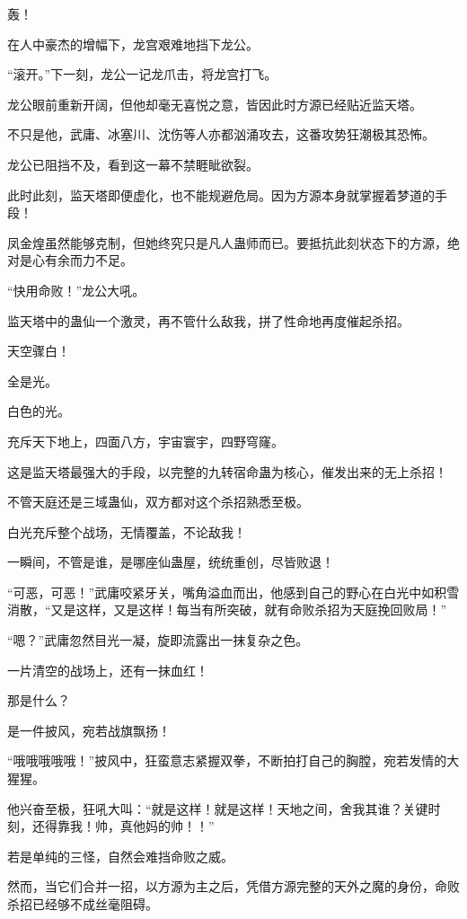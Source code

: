 
\begin{this_body}

轰！

在人中豪杰的增幅下，龙宫艰难地挡下龙公。

“滚开。”下一刻，龙公一记龙爪击，将龙宫打飞。

龙公眼前重新开阔，但他却毫无喜悦之意，皆因此时方源已经贴近监天塔。

不只是他，武庸、冰塞川、沈伤等人亦都汹涌攻去，这番攻势狂潮极其恐怖。

龙公已阻挡不及，看到这一幕不禁睚眦欲裂。

此时此刻，监天塔即便虚化，也不能规避危局。因为方源本身就掌握着梦道的手段！

凤金煌虽然能够克制，但她终究只是凡人蛊师而已。要抵抗此刻状态下的方源，绝对是心有余而力不足。

“快用命败！”龙公大吼。

监天塔中的蛊仙一个激灵，再不管什么敌我，拼了性命地再度催起杀招。

天空骤白！

全是光。

白色的光。

充斥天下地上，四面八方，宇宙寰宇，四野穹窿。

这是监天塔最强大的手段，以完整的九转宿命蛊为核心，催发出来的无上杀招！

不管天庭还是三域蛊仙，双方都对这个杀招熟悉至极。

白光充斥整个战场，无情覆盖，不论敌我！

一瞬间，不管是谁，是哪座仙蛊屋，统统重创，尽皆败退！

“可恶，可恶！”武庸咬紧牙关，嘴角溢血而出，他感到自己的野心在白光中如积雪消散，“又是这样，又是这样！每当有所突破，就有命败杀招为天庭挽回败局！”

“嗯？”武庸忽然目光一凝，旋即流露出一抹复杂之色。

一片清空的战场上，还有一抹血红！

那是什么？

是一件披风，宛若战旗飘扬！

“哦哦哦哦哦！”披风中，狂蛮意志紧握双拳，不断拍打自己的胸膛，宛若发情的大猩猩。

他兴奋至极，狂吼大叫：“就是这样！就是这样！天地之间，舍我其谁？关键时刻，还得靠我！帅，真他妈的帅！！”

若是单纯的三怪，自然会难挡命败之威。

然而，当它们合并一招，以方源为主之后，凭借方源完整的天外之魔的身份，命败杀招已经够不成丝毫阻碍。


\end{this_body}
